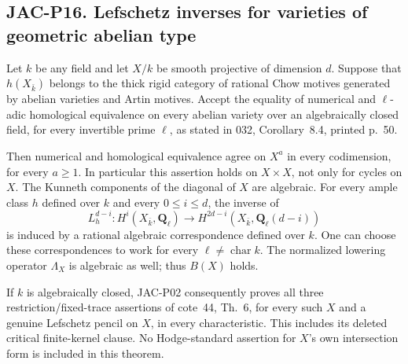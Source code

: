 
\subsection*{JAC-P16. Lefschetz inverses for varieties of geometric abelian type}

\begin{theorem}[JAC-P16]\label{jac:P16}
Let $k$ be any field and let $X/k$ be smooth projective of dimension
$d$. Suppose that $h(X_{\bar k})$ belongs to the thick rigid
category of rational Chow motives generated by abelian varieties
and Artin motives. Accept the equality of numerical and
$\ell$-adic homological equivalence on every abelian variety over
an algebraically closed field, for every invertible prime $\ell$,
as stated in 032, Corollary~8.4, printed p.~50.

Then numerical and homological equivalence agree on $X^a$ in
every codimension, for every $a\ge1$. In particular this assertion
holds on $X\times X$, not only for cycles on $X$.
The Kunneth components of the diagonal of $X$ are algebraic.
For every ample class $h$ defined over $k$ and every $0\le i\le d$,
the inverse of
\[
 L_h^{d-i}:H^i(X_{\bar k},\mathbf Q_\ell)
       \longrightarrow
 H^{2d-i}(X_{\bar k},\mathbf Q_\ell(d-i))                 \tag{JAC.P16.1}
\]
is induced by a rational algebraic correspondence defined over $k$.
One can choose these correspondences to work for every
$\ell\ne\operatorname{char}k$. The normalized lowering operator
$\Lambda_X$ is algebraic as well; thus $B(X)$ holds.

If $k$ is algebraically closed, JAC-P02 consequently proves all
three restriction/fixed-trace assertions of cote~44, Th.~6, for
every such $X$ and a genuine Lefschetz pencil on $X$, in every
characteristic. This includes its deleted critical finite-kernel
clause. No Hodge-standard assertion for $X$'s own intersection
form is included in this theorem.
\end{theorem}

